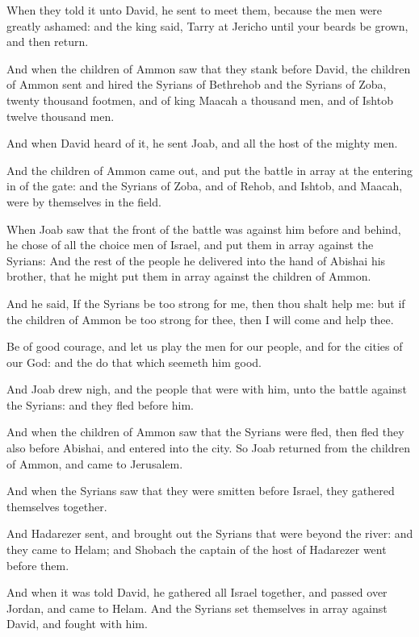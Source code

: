 \verse When they told it unto David, he sent to meet them, because the men were greatly ashamed: and the king said, Tarry at Jericho until your beards be grown, and then return.

\verse And when the children of Ammon saw that they stank before David, the children of Ammon sent and hired the Syrians of Bethrehob and the Syrians of Zoba, twenty thousand footmen, and of king Maacah a thousand men, and of Ishtob twelve thousand men.

\verse And when David heard of it, he sent Joab, and all the host of the mighty men.

\verse And the children of Ammon came out, and put the battle in array at the entering in of the gate: and the Syrians of Zoba, and of Rehob, and Ishtob, and Maacah, were by themselves in the field.

\verse When Joab saw that the front of the battle was against him before and behind, he chose of all the choice men of Israel, and put them in array against the Syrians: \verse And the rest of the people he delivered into the hand of Abishai his brother, that he might put them in array against the children of Ammon.

\verse And he said, If the Syrians be too strong for me, then thou shalt help me: but if the children of Ammon be too strong for thee, then I will come and help thee.

\verse Be of good courage, and let us play the men for our people, and for the cities of our God: and the \LORD do that which seemeth him good.

\verse And Joab drew nigh, and the people that were with him, unto the battle against the Syrians: and they fled before him.

\verse And when the children of Ammon saw that the Syrians were fled, then fled they also before Abishai, and entered into the city. So Joab returned from the children of Ammon, and came to Jerusalem.

\verse And when the Syrians saw that they were smitten before Israel, they gathered themselves together.

\verse And Hadarezer sent, and brought out the Syrians that were beyond the river: and they came to Helam; and Shobach the captain of the host of Hadarezer went before them.

\verse And when it was told David, he gathered all Israel together, and passed over Jordan, and came to Helam. And the Syrians set themselves in array against David, and fought with him.

